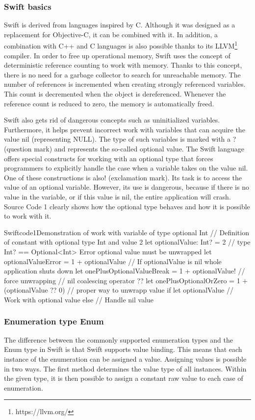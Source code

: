 \documentclass[
  biblatex = false,
  language=english,
  figures=false,
  sourcecodes,
  glossaries,
  index
]{kidiplom}
\begin{document}
\subsubsection{Swift basics}
Swift is derived from languages inspired by C. Although it was designed as a replacement for Objective-C, it can be combined with it. In addition, a combination with C++ and C languages is also possible thanks to its LLVM\footnote{https://llvm.org/} compiler. In order to free up operational memory, Swift uses the concept of deterministic reference counting to work with memory. Thanks to this concept, there is no need for a garbage collector to search for unreachable memory. The number of references is incremented when creating strongly referenced variables. This count is decremented when the object is dereferenced. Whenever the reference count is reduced to zero, the memory is automatically freed.

Swift also gets rid of dangerous concepts such as uninitialized variables. Furthermore, it helps prevent incorrect work with variables that can acquire the value nil (representing NULL). The type of such variables is marked with a ? (question mark) and represents the so-called optional value. The Swift language offers special constructs for working with an optional type that forces programmers to explicitly handle the case when a variable takes on the value nil. One of these constructions is also! (exclamation mark). Its task is to access the value of an optional variable. However, its use is dangerous, because if there is no value in the variable, or if this value is nil, the entire application will crash. Source Code 1 clearly shows how the optional type behaves and how it is possible to work with it.

\FloatBarrier
\begin{kicode}{Swift}{code1}{Demonstration of work with variable of type optional Int}
// Definition of constant with optional type Int and value 2
let optionalValue: Int? = 2 // type Int? == Optional<Int>
Error optional value must be unwrapped
let optionalValueError = 1 + optionalValue
// If optionalValue is nil whole application shuts down
let onePlusOptionalValueBreak = 1 + optionalValue! // force unwrapping
// nil coalescing operator ??
let onePlusOptionalOrZero = 1 + (optionalValue ?? 0)
// proper way to unwrapp value
if let optionalValue {
// Work with optional value
} else {
// Handle nil value
}
\end{kicode}
\FloatBarrier

\subsubsection{Enumeration type Enum}
The difference between the commonly supported enumeration types and the Enum type in Swift is that Swift supports value binding. This means that each instance of the enumeration can be assigned a value. Assigning values is possible in two ways. The first method determines the value type of all instances. Within the given type, it is then possible to assign a constant raw value to each case of enumeration.
\end{document}

